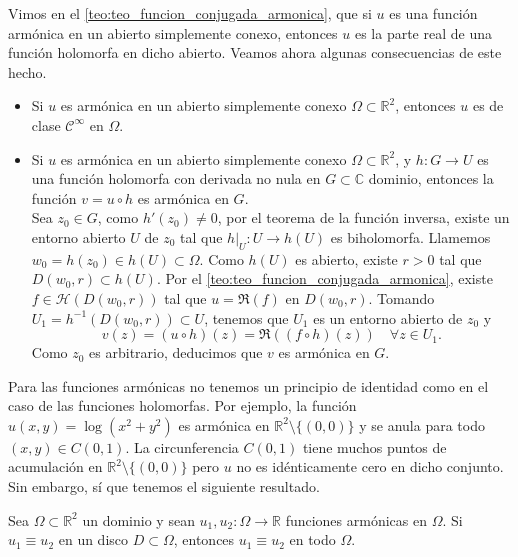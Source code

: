 Vimos en el \cref{teo:teo_funcion_conjugada_armonica}, que si $u$ es una función armónica en un abierto simplemente conexo, entonces $u$ es la parte real de una función holomorfa en dicho abierto. Veamos ahora algunas consecuencias de este hecho.\\
\begin{itemize}
    \item Si $u$ es armónica en un abierto simplemente conexo $\Omega \subset \mathbb{R}^2$, entonces $u$ es de clase $\mathcal{C}^\infty$ en $\Omega$.
    \item Si $u$ es armónica en un abierto simplemente conexo $\Omega \subset \mathbb{R}^2$, y $h: G \to U$ es una función holomorfa con derivada no nula en $G \subset \mathbb{C}$ dominio, entonces la función $v = u \circ h$ es armónica en $G$.\\
    Sea $z_0 \in G$, como $h'(z_0) \neq 0$, por el teorema de la función inversa, existe un entorno abierto $U$ de $z_0$ tal que $h|_U: U \to h(U)$ es biholomorfa. Llamemos $w_0 = h(z_0) \in h(U) \subset \Omega$. Como $h(U)$ es abierto, existe $r > 0$ tal que $D(w_0,r) \subset h(U)$. Por el \cref{teo:teo_funcion_conjugada_armonica}, existe $f \in \mathcal{H}(D(w_0,r))$ tal que $u = \Re(f)$ en $D(w_0,r)$. Tomando $U_1 = h^{-1}(D(w_0,r)) \subset U$, tenemos que $U_1$ es un entorno abierto de $z_0$ y
    \[
        v(z) = (u \circ h)(z) = \Re((f \circ h)(z)) \quad \forall z \in U_1.
    \]
    Como $z_0$ es arbitrario, deducimos que $v$ es armónica en $G$.
\end{itemize}

Para las funciones armónicas no tenemos un principio de identidad como en el caso de las funciones holomorfas. Por ejemplo, la función $u(x,y) = \log(x^2 + y^2)$ es armónica en $\mathbb{R}^2 \setminus \{(0,0)\}$ y se anula para todo $(x,y) \in C(0,1)$. La circunferencia $C(0,1)$ tiene muchos puntos de acumulación en $\mathbb{R}^2 \setminus \{(0,0)\}$ pero $u$ no es idénticamente cero en dicho conjunto. Sin embargo, sí que tenemos el siguiente resultado.

\begin{teorema}
    Sea $\Omega \subset \mathbb{R}^2$ un dominio y sean $u_1,u_2:\Omega \to \mathbb{R}$ funciones armónicas en $\Omega$. Si $u_1 \equiv u_2$ en un disco $D \subset \Omega$, entonces $u_1 \equiv u_2$ en todo $\Omega$.
\end{teorema}

